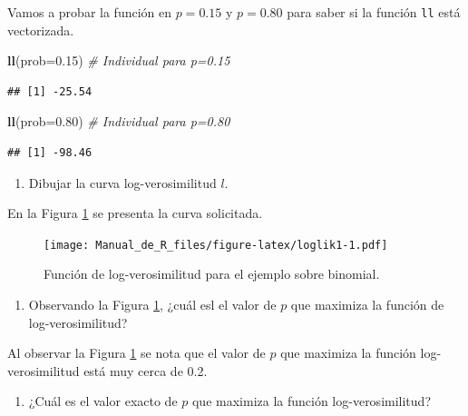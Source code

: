 \documentclass[10pt,]{krantz}
\makeatletter
\newenvironment{Shaded}{\begin{snugshade}}{\end{snugshade}}
\newcommand{\KeywordTok}[1]{\textcolor[rgb]{0.13,0.29,0.53}{\textbf{#1}}}
\newcommand{\DataTypeTok}[1]{\textcolor[rgb]{0.13,0.29,0.53}{#1}}
\newcommand{\FloatTok}[1]{\textcolor[rgb]{0.00,0.00,0.81}{#1}}
\newcommand{\CommentTok}[1]{\textcolor[rgb]{0.56,0.35,0.01}{\textit{#1}}}
\newcommand{\NormalTok}[1]{#1}
\providecommand{\tightlist}{%
  \setlength{\itemsep}{0pt}\setlength{\parskip}{0pt}}
\newenvironment{kframe}{%
\medskip{}
\setlength{\fboxsep}{.8em}
 \def\at@end@of@kframe{}%
 \ifinner\ifhmode%
  \def\at@end@of@kframe{\end{minipage}}%
  \begin{minipage}{\columnwidth}%
 \fi\fi%
 \def\FrameCommand##1{\hskip\@totalleftmargin \hskip-\fboxsep
 \colorbox{shadecolor}{##1}\hskip-\fboxsep
     \hskip-\linewidth \hskip-\@totalleftmargin \hskip\columnwidth}%
 \MakeFramed {\advance\hsize-\width
   \@totalleftmargin\z@ \linewidth\hsize
   \@setminipage}}%
 {\par\unskip\endMakeFramed%
 \at@end@of@kframe}
\renewenvironment{Shaded}{\begin{kframe}}{\end{kframe}}
\makeatother
\begin{document}
Vamos a probar la función en \(p=0.15\) y \(p=0.80\) para saber si la
función \texttt{ll} está vectorizada.

\begin{Shaded}
\begin{Highlighting}[]
\KeywordTok{ll}\NormalTok{(}\DataTypeTok{prob=}\FloatTok{0.15}\NormalTok{)  }\CommentTok{# Individual para p=0.15}
\end{Highlighting}
\end{Shaded}

\begin{verbatim}
## [1] -25.54
\end{verbatim}

\begin{Shaded}
\begin{Highlighting}[]
\KeywordTok{ll}\NormalTok{(}\DataTypeTok{prob=}\FloatTok{0.80}\NormalTok{)  }\CommentTok{# Individual para p=0.80}
\end{Highlighting}
\end{Shaded}

\begin{verbatim}
## [1] -98.46
\end{verbatim}

\begin{enumerate}
\def\labelenumi{\arabic{enumi})}
\setcounter{enumi}{2}
\tightlist
\item
  Dibujar la curva log-verosimilitud \(l\).
\end{enumerate}

En la Figura \ref{fig:loglik1} se presenta la curva solicitada.

\begin{figure}
\centering
\texttt{[image: Manual\_de\_R\_files/figure-latex/loglik1-1.pdf]}
\caption{\label{fig:loglik1}Función de log-verosimilitud para el ejemplo
sobre binomial.}
\end{figure}

\begin{enumerate}
\def\labelenumi{\arabic{enumi})}
\setcounter{enumi}{3}
\tightlist
\item
  Observando la Figura \ref{fig:loglik1}, ¿cuál esl el valor de \(p\)
  que maximiza la función de log-verosimilitud?
\end{enumerate}

Al observar la Figura \ref{fig:loglik1} se nota que el valor de \(p\)
que maximiza la función log-verosimilitud está muy cerca de 0.2.

\begin{enumerate}
\def\labelenumi{\arabic{enumi})}
\setcounter{enumi}{4}
\tightlist
\item
  ¿Cuál es el valor exacto de \(p\) que maximiza la función
  log-verosimilitud?
\end{enumerate}
\end{document}
